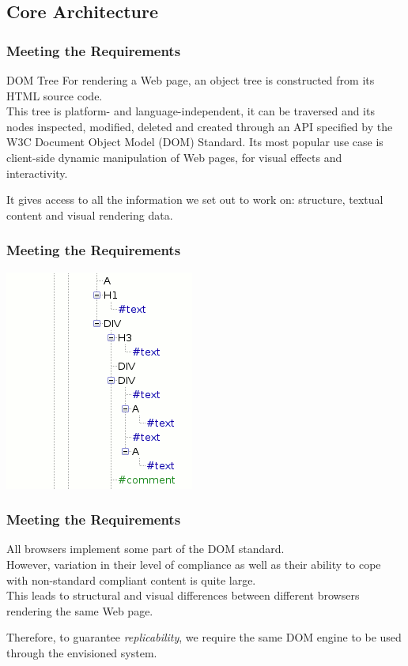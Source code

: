 \documentclass{beamer}
\begin{document}
    \subsection{Core Architecture}
        \begin{frame}
            \frametitle{Meeting the Requirements}
            \begin{block}{DOM Tree}
                For rendering a Web page, an object tree is constructed from its HTML source code. \\
                This tree is platform- and language-independent, it can be traversed and its nodes inspected, modified, deleted and created through an API specified by the W3C Document Object Model (DOM) Standard.
                Its most popular use case is client-side dynamic manipulation of Web pages, for visual effects and interactivity.

                \medskip
                It gives access to all the information we set out to work on: structure, textual content and visual rendering data.
            \end{block}
        \end{frame}

        \begin{frame}
            \frametitle{Meeting the Requirements}
            \begin{center}
                \includegraphics[height=.75\textheight]{Dom-inspector-baumstruktur.png}
            \end{center}
        \end{frame}

        \begin{frame}
            \frametitle{Meeting the Requirements}
            \begin{block}{}
                All browsers implement some part of the DOM standard. \\
                However, variation in their level of compliance as well as their ability to cope with non-standard compliant content is quite large. \\
                This leads to structural and visual differences between different browsers rendering the same Web page.

                \medskip
                Therefore, to guarantee \textit{replicability}, we require the same DOM engine to be used through the envisioned system.
            \end{block}
        \end{frame}
\end{document}
